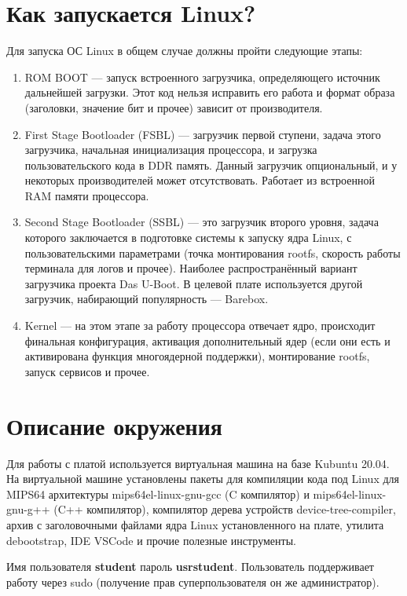 \section*{Как запускается Linux?}
Для запуска ОС Linux в общем случае должны пройти следующие этапы:
\begin{enumerate}
	\item  ROM BOOT — запуск встроенного загрузчика, определяющего источник дальнейшей загрузки. Этот код нельзя исправить его работа и формат образа (заголовки, значение бит и прочее) зависит от производителя.
	
	\item First Stage Bootloader (FSBL) — загрузчик первой ступени, задача этого загрузчика, начальная инициализация процессора, и загрузка пользовательского кода в DDR память. Данный загрузчик опциональный, и у некоторых производителей может отсутствовать. Работает из встроенной RAM памяти процессора.
	
	\item Second Stage Bootloader (SSBL) — это загрузчик второго уровня, задача которого заключается в подготовке системы к запуску ядра Linux, с пользовательскими параметрами (точка монтирования rootfs, скорость работы терминала для логов и прочее). Наиболее распространённый вариант загрузчика проекта Das U-Boot. В целевой плате используется другой загрузчик, набирающий популярность — Barebox.
	
	\item Kernel — на этом этапе за работу процессора отвечает ядро, происходит финальная конфигурация, активация дополнительный ядер (если они есть и активирована функция многоядерной поддержки), монтирование rootfs, запуск сервисов и прочее.
\end{enumerate}


\section*{Описание окружения}
Для работы с платой используется виртуальная машина на базе Kubuntu 20.04. На виртуальной машине установлены пакеты для компиляции кода под Linux для MIPS64 архитектуры mips64el-linux-gnu-gcc (C компилятор) и mips64el-linux-gnu-g++ (C++ компилятор), компилятор дерева устройств device-tree-compiler, архив с заголовочными файлами ядра Linux установленного на плате, утилита debootstrap, IDE VSCode и прочие полезные инструменты. 

Имя пользователя \textbf{student} пароль \textbf{usrstudent}. Пользователь поддерживает работу через sudo (получение прав суперпользователя он же администратор).

